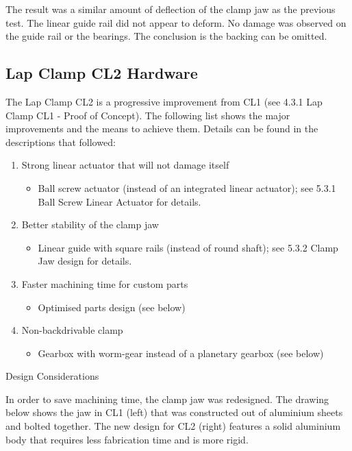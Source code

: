 \begin{itemize}
The result was a similar amount of deflection of the clamp jaw as the previous test. The linear guide rail did not appear to deform. No damage was observed on the guide rail or the bearings. The conclusion is the backing can be omitted.

\subsection{Lap Clamp CL2 Hardware}

The Lap Clamp CL2 is a progressive improvement from CL1 (see 4.3.1 Lap Clamp CL1 - Proof of Concept). The following list shows the major improvements and the means to achieve them. Details can be found in the descriptions that followed:
\begin{enumerate}
\item Strong linear actuator that will not damage itself
    \begin{itemize}
        \item Ball screw actuator (instead of an integrated linear actuator); see 5.3.1 Ball Screw Linear Actuator for details.
    \end{itemize}
\item Better stability of the clamp jaw 
    \begin{itemize}
    \item Linear guide with square rails (instead of round shaft); see 5.3.2 Clamp Jaw design for details.
    \end{itemize}
\item Faster machining time for custom parts
    \begin{itemize}
    \item Optimised parts design (see below)
    \end{itemize}
\item Non-backdrivable clamp
    \begin{itemize}
    \item Gearbox with worm-gear instead of a planetary gearbox (see below)
    \end{itemize}
\end{enumerate}

Design Considerations

In order to save machining time, the clamp jaw was redesigned. The drawing below shows the jaw in CL1 (left) that was constructed out of aluminium sheets and bolted together. The new design for CL2 (right) features a solid aluminium body that requires less fabrication time and is more rigid. 


\end{itemize}
